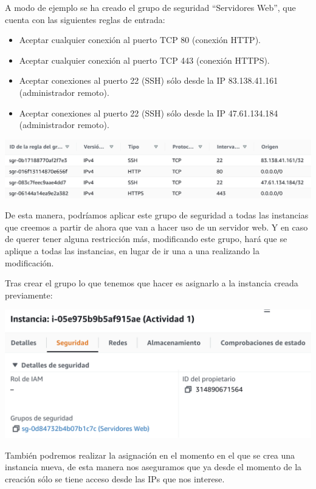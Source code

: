 \documentclass{\ClassPath/viu-tfm-template}
\begin{document}
A modo de ejemplo se ha creado el grupo de seguridad “Servidores Web”, que cuenta con las siguientes reglas de entrada:
\begin{itemize}
    \item Aceptar cualquier conexión al puerto TCP 80 (conexión HTTP).
    \item Aceptar cualquier conexión al puerto TCP 443 (conexión HTTPS).
    \item Aceptar conexiones al puerto 22 (SSH) sólo desde la IP 83.138.41.161 (administrador remoto).
    \item Aceptar conexiones al puerto 22 (SSH) sólo desde la IP 47.61.134.184 (administrador remoto).
\end{itemize}

\begin{center}
    \includegraphics[frame,width=\linewidth]{img/grupos.png}
\end{center}

De esta manera, podríamos aplicar este grupo de seguridad a todas las instancias que creemos a partir de ahora que van a hacer uso de un servidor web. Y en caso de querer tener alguna restricción más, modificando este grupo, hará que se aplique a todas las instancias, en lugar de ir una a una realizando la modificación.

Tras crear el grupo lo que tenemos que hacer es asignarlo a la instancia creada previamente:

\begin{center}
    \includegraphics[frame,width=0.8\linewidth]{img/grupos2.png}
\end{center}

También podremos realizar la asignación en el momento en el que se crea una instancia nueva, de esta manera nos aseguramos que ya desde el momento de la creación sólo se tiene acceso desde las IPs que nos interese.
\end{document}

